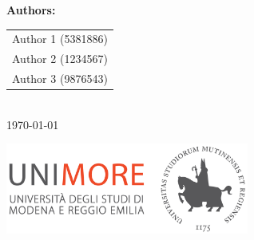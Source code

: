 \begin{titlepage}
    {\Large \textbf{\textcolor{tudelftdarkblue}{Authors:}}}\\[0.5cm]
    \begin{tabular}{c}
        \Large \textcolor{tudelftdarkblue}{Author 1 (5381886)} \\
        \Large \textcolor{tudelftdarkblue}{Author 2 (1234567)} \\
        \Large \textcolor{tudelftdarkblue}{Author 3 (9876543)} \\
    \end{tabular}\\[2cm]
    
    {\Large \textcolor{tudelftdarkblue}{\today}}
    
    \vfill
    \begin{center}
        \includegraphics[width=0.6\textwidth]{images/Logo_C_Positivo_Colore.png}
    \end{center}
\end{titlepage}